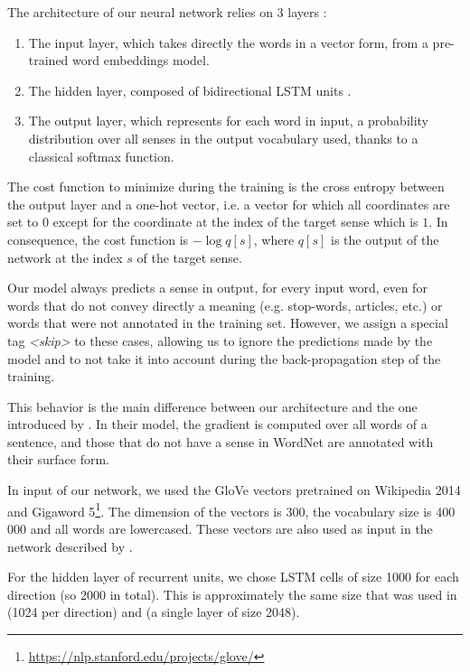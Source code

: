 \documentclass[11pt,a4paper]{article}
\begin{document}
The architecture of our neural network relies on 3 layers :

\begin{enumerate}
    \item The input layer, which takes directly the words in a vector form, from a pre-trained word embeddings model. \item The hidden layer, composed of bidirectional LSTM units \citep{LSTM1997}. \item The output layer, which represents for each word in input, a probability distribution over all senses in the output vocabulary used, thanks to a classical softmax function.
\end{enumerate}

The cost function to minimize during the training is the cross entropy between the output layer and a one-hot vector, i.e. a vector for which all coordinates are set to $0$ except for the coordinate at the index of the target sense which is $1$. In consequence, the cost function is $-\log q[s]$, where $q[s]$ is the output of the network at the index $s$ of the target sense.



Our model always predicts a sense in output, for every input word, even for words that do not convey directly a meaning (e.g. stop-words, articles, etc.) or words that were not annotated in the training set. However, we assign a special tag \textit{<skip>} to these cases, allowing us to ignore the predictions made by the model and to not take it into account during the back-propagation step of the training. 

This behavior is the main difference between our architecture and the one introduced by \cite{raganato2017}. In their model, the gradient is computed over all words of a sentence, and those that do not have a sense in WordNet are annotated with their surface form.




In input of our network, we used the GloVe vectors \citep{pennington2014glove} pretrained on Wikipedia 2014 and Gigaword 5\footnote{\url{https://nlp.stanford.edu/projects/glove/}}. The dimension of the vectors is 300, the vocabulary size is 400\,000 and all words are lowercased. These vectors are also used as input in the network described by \cite{kaageback2016word}. 

For the hidden layer of recurrent units, we chose LSTM cells of size 1000 for each direction (so 2000 in total). This is approximately the same size that was used in \cite{raganato2017} (1024 per direction) and \cite{yuan_2016} (a single layer of size 2048).
\end{document}
